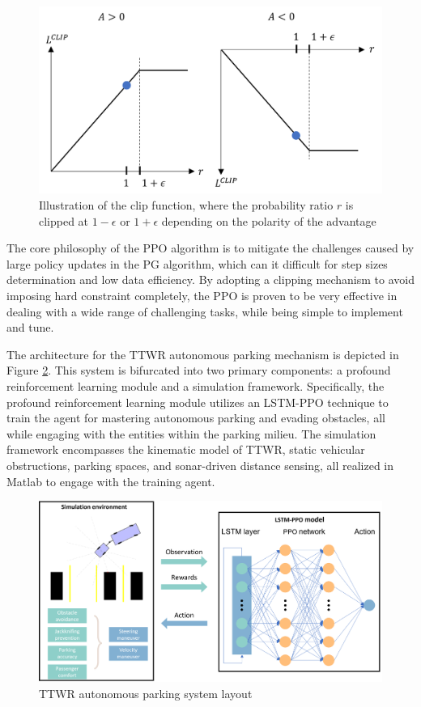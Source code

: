 \begin{figure}[h]
    \centering
    \includegraphics[width=0.6\linewidth]{fig/clip_function.png}
    \caption{Illustration of the clip function, where the probability ratio $r$ is clipped at $1-\epsilon$ or $1+\epsilon$ depending on the polarity of the advantage}
    \label{fig: clip function}
\end{figure}

The core philosophy of the PPO algorithm is to mitigate the challenges caused by large policy updates in the PG algorithm, which can it difficult for step sizes determination and low data efficiency. By adopting a clipping mechanism to avoid imposing hard constraint completely, the PPO is proven to be very effective in dealing with a wide range of challenging tasks, while being simple to implement and tune.

The architecture for the TTWR autonomous parking mechanism is depicted in Figure \ref{fig: TTWR training process}. This system is bifurcated into two primary components: a profound reinforcement learning module and a simulation framework. Specifically, the profound reinforcement learning module utilizes an LSTM-PPO technique to train the agent for mastering autonomous parking and evading obstacles, all while engaging with the entities within the parking milieu. The simulation framework encompasses the kinematic model of TTWR, static vehicular obstructions, parking spaces, and sonar-driven distance sensing, all realized in Matlab to engage with the training agent.

\begin{figure}[h]
    \centering
    \includegraphics[width=0.9\linewidth]{fig/ppo/system_architecture.png}
    \caption{TTWR autonomous parking system layout}
    \label{fig: TTWR training process}
\end{figure}

